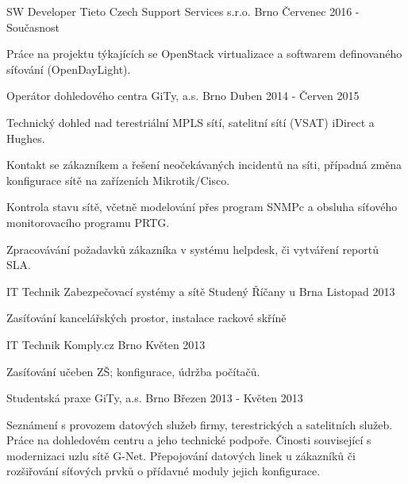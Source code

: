 

\begin{cventries}

  \cventry
    {SW Developer}
    {Tieto Czech Support Services s.r.o.}
    {Brno}
    {Červenec 2016 - Současnost}
    {
      \begin{cvitems}
       \item {Práce na projektu týkajících se OpenStack virtualizace a softwarem definovaného síťování (OpenDayLight).}       
      \end{cvitems}
    }
  
  \cventry
    {Operátor dohledového centra} %
    {GiTy, a.s.} %
    {Brno} %
    {Duben 2014 - Červen 2015} %
    {
      \begin{cvitems} %
        \item {Technický dohled nad terestriální MPLS sítí, satelitní sítí (VSAT) iDirect a Hughes.}
        \item {Kontakt se zákazníkem a řešení neočekávaných incidentů na síti, případná změna konfigurace sítě na zařízeních Mikrotik/Cisco.}
        \item {Kontrola stavu sítě, včetně modelování přes program SNMPc a obsluha síťového monitorovacího programu PRTG.}
        \item {Zpracovávání požadavků zákazníka v systému helpdesk, či vytváření reportů SLA. }
      \end{cvitems}
    }
   \cventry
   {IT Technik}
   {Zabezpečovací systémy a sítě Studený}
   {Říčany u Brna}
   {Listopad 2013}
   {
    \begin{cvitems}
      \item {Zasíťování kancelářských prostor, instalace rackové skříně}
    \end{cvitems}
   }
   
   \cventry
   {IT Technik}
   {Komply.cz}
   {Brno}
   {Květen 2013}
   {
    \begin{cvitems}
      \item {Zasíťování učeben ZŠ; konfigurace, údržba počítačů.}
    \end{cvitems}
   }
   \cventry
   {Studentská praxe}
   {GiTy, a.s.}
   {Brno}
   {Březen 2013 - Květen 2013}
   {
    \begin{cvitems}
      \item {Seznámení s provozem datových služeb firmy, terestrických a satelitních služeb. Práce na dohledovém centru a jeho technické podpoře.
      Činosti související s modernizaci uzlu sítě G-Net. Přepojování datových linek u zákazníků či rozšiřování síťových prvků o přídavné moduly jejich konfigurace.}
    \end{cvitems}
   }
   

\end{cventries}
